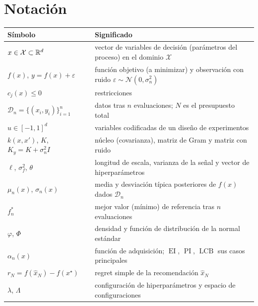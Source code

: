 \documentclass[11pt,a4paper,twoside,openany]{book}
\newcommand{\X}{\mathcal{X}}
\newcommand{\D}{\mathcal{D}}
\newcommand{\N}{\mathcal{N}}
\newcommand{\EI}{\operatorname{EI}}
\newcommand{\PI}{\operatorname{PI}}
\newcommand{\LCB}{\operatorname{LCB}}
\newcommand{\fmejor}{f^{*}_{n}}
\newcommand{\Ky}{K_{y}}
\begin{document}
\section*{Notación}
\begin{center}\small
\begin{tabularx}{\textwidth}{@{}l>{\raggedright\arraybackslash}X@{}}
\toprule
Símbolo & Significado \\
\midrule
$x\in\X\subset\R^{d}$ & vector de variables de decisión (parámetros del proceso) en el dominio $\X$ \\
$f(x)$, $y=f(x)+\varepsilon$ & función objetivo (a minimizar) y observación con ruido $\varepsilon\sim\N(0,\sigma_n^2)$ \\
$c_j(x)\le 0$ & restricciones \\
$\D_n=\{(x_i,y_i)\}_{i=1}^{n}$ & datos tras $n$ evaluaciones; $N$ es el presupuesto total \\
$u\in[-1,1]^{d}$ & variables codificadas de un diseño de experimentos \\
$k(x,x')$, $K$, $\Ky=K+\sigma_n^2 I$ & núcleo (covarianza), matriz de Gram y matriz con ruido \\
$\ell$, $\sigma_f^2$, $\theta$ & longitud de escala, varianza de la señal y vector de hiperparámetros \\
$\mu_n(x)$, $\sigma_n(x)$ & media y desviación típica posteriores de $f(x)$ dados $\D_n$ \\
$\fmejor$ & mejor valor (mínimo) de referencia tras $n$ evaluaciones \\
$\varphi$, $\Phi$ & densidad y función de distribución de la normal estándar \\
$\alpha_n(x)$ & función de adquisición; $\EI$, $\PI$, $\LCB$ sus casos principales \\
$r_N=f(\hat x_N)-f(x^\star)$ & regret simple de la recomendación $\hat x_N$ \\
$\lambda$, $\Lambda$ & configuración de hiperparámetros y espacio de configuraciones \\
\bottomrule
\end{tabularx}
\end{center}


\tableofcontents

\mainmatter







\backmatter

\end{document}

